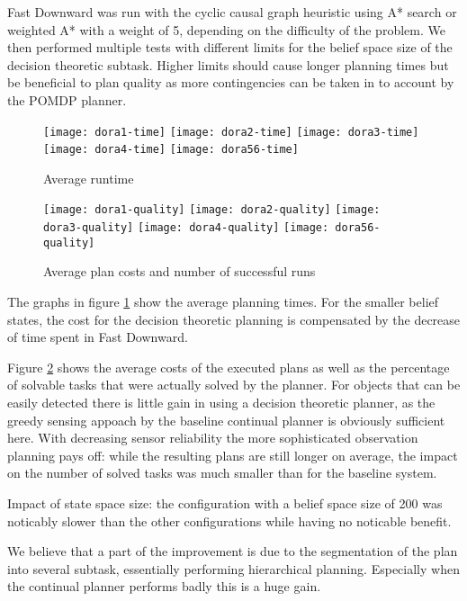 Fast Downward was run with the cyclic causal graph heuristic using A*
search or weighted A* with a weight of 5, depending on the difficulty
of the problem. We then performed multiple tests with different limits
for the belief space size of the decision theoretic subtask. Higher
limits should cause longer planning times but be beneficial to plan
quality as more contingencies can be taken in to account by the POMDP
planner.

\begin{figure}[h!]
  \centering
  \texttt{[image: dora1-time]}
  \texttt{[image: dora2-time]}
  \texttt{[image: dora3-time]}
  \texttt{[image: dora4-time]}
  \texttt{[image: dora56-time]}
  \caption{Average runtime}
  \label{fig:results-time}
\end{figure}

\begin{figure}[h!]
  \centering
  \texttt{[image: dora1-quality]}
  \texttt{[image: dora2-quality]}
  \texttt{[image: dora3-quality]}
  \texttt{[image: dora4-quality]}
  \texttt{[image: dora56-quality]}
  \caption{Average plan costs and number of successful runs}
  \label{fig:results-quality}
\end{figure}


The graphs in figure \ref{fig:results-time} show the average planning
times. For the smaller belief states, the cost for the decision
theoretic planning is compensated by the decrease of time spent in
Fast Downward.

Figure \ref{fig:results-quality} shows the average costs of the
executed plans as well as the percentage of solvable tasks that were
actually solved by the planner. For objects that can be easily
detected there is little gain in using a decision theoretic planner,
as the greedy sensing appoach by the baseline continual planner is
obviously sufficient here. With decreasing sensor reliability the more
sophisticated observation planning pays off: while the resulting plans
are still longer on average, the impact on the number of solved tasks
was much smaller than for the baseline system.

Impact of state space size: the configuration with a belief space size
of 200 was noticably slower than the other configurations while having
no noticable benefit. 

We believe that a part of the improvement is due to the segmentation of
the plan into several subtask, essentially performing hierarchical
planning. Especially when the continual planner performs badly this is
a huge gain.

